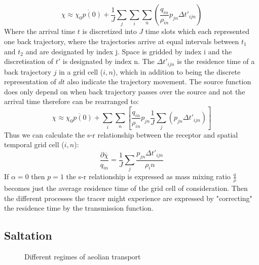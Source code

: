 \begin{equation}\label{eq:discrete_mix_ratio}
    \chi \approx \overline{\chi_0p(0)} + \frac{1}{J} \sum_j \sum_i \sum_n \left(\frac{q_{in}}{\rho_{in}}p_{jn}\Delta t'_{ijn}\right)
\end{equation}
Where the arrival time $t$ is discretized into $J$ time slots which each represented one back trajectory, where the trajectories arrive at equal intervals between $t_1$ and $t_2$ and are designated by index j. Space is gridded by index i and the discretisation of $t'$ is designated by index n. The $\Delta t'_{ijn}$ is the residence time of a back trajectory $j$ in a grid cell ($i,n$), which in addition to being the discrete representation of $dt$ also indicate the trajectory movement. The source function does only depend on when back trajectory passes over the source and not the arrival time therefore  can be rearranged to:
\begin{equation}
    \chi \approx \overline{\chi_0p(0)} + \sum_i \sum_n \left[\frac{q_{in}}{\rho_{in}}p_{jn} \frac{1}{J}\sum_j (p_{jn}\Delta t'_{ijn})\right]
\end{equation}
Thus we can calculate the s-r relationship between the receptor and spatial temporal grid cell ($i,n$):
\begin{equation}
    \frac{\partial \overline{\chi}}{q_{in}} = \frac{1}{J} \sum_j \frac{p_{jn} \Delta t'_{ijn}}{\rho_in}
\end{equation}
If $\alpha=0$ then $p=1$ the s-r relationship is expressed as mass mixing ratio $\frac{q}{\rho}$ becomes just the average residence time of the grid cell of consideration. Then the different processes the tracer might experience are expressed by "correcting" the residence time by the transmission function. 


\subsection{Saltation}\label{fig:Regimes_of_aeolian_transport}
\begin{figure}[htbp]
  \centering
  
  \caption{Different regimes of aeolian transport \parencite{nickling2009aeolian}}
\end{figure}